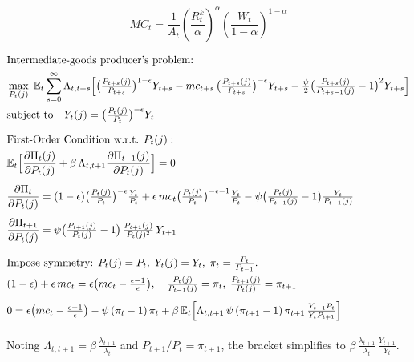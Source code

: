 \documentclass[11pt,preprint]{elsarticle}
\numberwithin{equation}{section}
\numberwithin{figure}{section}
\numberwithin{table}{section}
\begin{document}
\begin{equation}\label{marginal_cost_appendix}
\boxed{MC_t = \dfrac{1}{A_t} \left( \dfrac{R_t^k}{\alpha} \right)^{\alpha} \left( \dfrac{W_t}{1-\alpha} \right)^{1-\alpha}}
\end{equation}

\begin{align*}
& \text{Intermediate‐goods producer’s problem:} \\
& \max_{P_t(j)} \;\mathbb{E}_t \sum_{s=0}^{\infty} \Lambda_{t,t+s}
  \Bigl[
    \bigl(\tfrac{P_{t+s}(j)}{P_{t+s}}\bigr)^{1-\epsilon} Y_{t+s}
    - mc_{t+s}\,\bigl(\tfrac{P_{t+s}(j)}{P_{t+s}}\bigr)^{-\epsilon} Y_{t+s}
    - \tfrac{\psi}{2}\bigl(\tfrac{P_{t+s}(j)}{P_{t+s-1}(j)} - 1\bigr)^2 Y_{t+s}
  \Bigr] \\
& \text{subject to} \quad Y_t(j) = \bigl(\tfrac{P_t(j)}{P_t}\bigr)^{-\epsilon} Y_t
\\[1.5ex]
& \text{First‐Order Condition w.r.t. }P_t(j): \\
& \mathbb{E}_t\Bigl[
    \frac{\partial \Pi_t(j)}{\partial P_t(j)}
    + \beta\,\Lambda_{t,t+1}
      \frac{\partial \Pi_{t+1}(j)}{\partial P_t(j)}
  \Bigr] = 0
\\[1ex]
& \frac{\partial \Pi_t}{\partial P_t(j)}
  = (1-\epsilon)\bigl(\tfrac{P_t(j)}{P_t}\bigr)^{-\epsilon}\tfrac{Y_t}{P_t}
    + \epsilon\,mc_t\bigl(\tfrac{P_t(j)}{P_t}\bigr)^{-\epsilon-1}\tfrac{Y_t}{P_t}
    - \psi\bigl(\tfrac{P_t(j)}{P_{t-1}(j)}-1\bigr)\tfrac{Y_t}{P_{t-1}(j)}
\\[1ex]
& \frac{\partial \Pi_{t+1}}{\partial P_t(j)}
  = \psi\bigl(\tfrac{P_{t+1}(j)}{P_t(j)}-1\bigr)\,\tfrac{P_{t+1}(j)}{P_t(j)^2}\,Y_{t+1}
\\[2ex]
& \text{Impose symmetry: }P_t(j)=P_t,\;Y_t(j)=Y_t,\;\pi_t=\tfrac{P_t}{P_{t-1}}.\\
& (1-\epsilon)+\epsilon\,mc_t = \epsilon\bigl(mc_t-\tfrac{\epsilon-1}{\epsilon}\bigr),\quad
  \tfrac{P_t(j)}{P_{t-1}(j)}=\pi_t,\;\tfrac{P_{t+1}(j)}{P_t(j)}=\pi_{t+1}
\\[1ex]
& 0 = \epsilon\bigl(mc_t-\tfrac{\epsilon-1}{\epsilon}\bigr)
      - \psi\,(\pi_t-1)\,\pi_t
      + \beta\,\mathbb{E}_t\Bigl[
          \Lambda_{t,t+1}\,\psi\,(\pi_{t+1}-1)\,\pi_{t+1}
          \,\tfrac{Y_{t+1}P_t}{Y_tP_{t+1}}
        \Bigr]
\\[1ex]
\end{align*}

Noting \(\Lambda_{t,t+1}=\beta\,\tfrac{\lambda_{t+1}}{\lambda_t}\) and
\(P_{t+1}/P_t=\pi_{t+1}\), the bracket simplifies to
\(\beta\,\tfrac{\lambda_{t+1}}{\lambda_t}\,\tfrac{Y_{t+1}}{Y_t}\).
\end{document}
